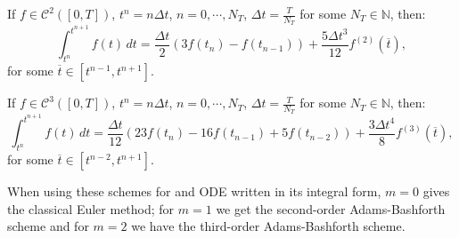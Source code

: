 \begin{corollary}
	\label{anexo-numint-col2}
	If $f\in \mathcal{C}^2([0,T])$, $t^n = n\Delta t$, $n=0, \cdots, N_T$, $\Delta t = \frac{T}{N_T}$ 
	for some $N_T \in \mathbb{N}$, then:
	\begin{equation}
		\int_{t^n}^{t^{n+1}} f(t)\,dt = \frac{\Delta t}{2} (3f(t_{n}) - f(t_{n-1}) )
		+ \frac{5\Delta t^{3}}{12} f^{(2)}(\overline{t}),
	\end{equation}
	for some $\overline{t} \in [t^{n-1}, t^{n+1}]$.
\end{corollary}

\begin{corollary}
	\label{anexo-numint-col3}
	If $f\in \mathcal{C}^3([0,T])$, $t^n = n\Delta t$, $n=0, \cdots, N_T$, $\Delta t = \frac{T}{N_T}$ 
	for some $N_T \in \mathbb{N}$, then:
	\begin{equation}
		\int_{t^n}^{t^{n+1}} f(t)\,dt = \frac{\Delta t}{12} (23f(t_{n}) - 16f(t_{n-1}) + 5f(t_{n-2}) )
		+ \frac{3\Delta t^{4}}{8} f^{(3)}(\overline{t}),
	\end{equation}
	for some $\overline{t} \in [t^{n-2}, t^{n+1}]$.
\end{corollary}

When using these schemes for and ODE written in its integral form,
$m=0$ gives the classical Euler method; for $m=1$ we get the second-order Adams-Bashforth scheme
and for $m=2$ we have the third-order Adams-Bashforth scheme.

